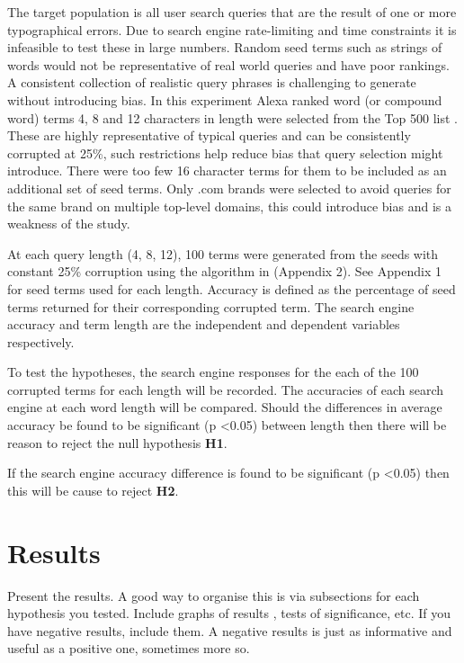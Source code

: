 \documentclass{csfourzero}
\begin{document}
The target population is all user search queries that are the result of one or more typographical errors. Due to search engine rate-limiting and time constraints it is infeasible to test these in large numbers. Random seed terms such as strings of words would not be representative of real world queries and have poor rankings. A consistent collection of realistic query phrases is challenging to generate without introducing bias. In this experiment Alexa ranked word (or compound word) terms 4, 8 and 12 characters in length were selected from the Top 500 list \cite{alexatop500}. These are highly representative of typical queries and can be consistently corrupted at 25\%, such restrictions help reduce bias that query selection might introduce. There were too few 16 character terms for them to be included as an additional set of seed terms. Only .com brands were selected to avoid queries for the same brand on multiple top-level domains, this could introduce bias and is a weakness of the study.

At each query length (4, 8, 12), 100 terms were generated from the seeds with constant 25\% corruption using the algorithm in (Appendix 2). See Appendix 1 for seed terms used for each length. Accuracy is defined as the percentage of seed terms returned for their corresponding corrupted term. The search engine accuracy and term length are the independent and dependent variables respectively.

To test the hypotheses, the search engine responses for the each of the 100 corrupted terms for each length will be recorded. The accuracies of each search engine at each word length will be compared. Should the differences in average accuracy be found to be significant (p \textless 0.05) between length then there will be reason to reject the null hypothesis \textbf{H1}.

If the search engine accuracy difference is found to be significant (p \textless 0.05) then this will be cause to reject \textbf{H2}.

\section{Results}
\label{sec:results}

Present the results. A good way to organise this is via subsections
for each hypothesis you tested. Include graphs of results
, tests of significance, etc. If you have
negative results, include them. A negative results is just as
informative and useful as a positive one, sometimes more so.
\end{document}
